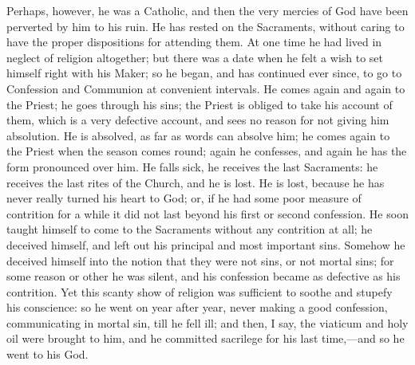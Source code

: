 Perhaps, however, he was a Catholic, and then the very mercies of
God have been perverted by him to his ruin. He has rested on the
Sacraments, without caring to have the proper dispositions for
attending them. At one time he had lived in neglect of religion
altogether; but there was a date when he felt a wish to set himself
right with his Maker; so he began, and has continued ever since, to go
to Confession and Communion at convenient intervals. He comes again
and again to the Priest; he goes through his sins; the Priest is
obliged to take his account of them, which is a very defective
account, and sees no reason for not giving him absolution. He is
absolved, as far as words can absolve him; he comes again to the
Priest when the season comes round; again he confesses, and again he
has the form pronounced over him. He falls sick, he receives the last
Sacraments: he receives the last rites of the Church, and he is lost.
He is lost, because he has never really turned his heart to God; or,
if he had some poor measure of contrition for a while it did not last
beyond his first or second confession. He soon taught himself to come
to the Sacraments without any contrition at all; he deceived himself,
and left out his principal and most important sins. Somehow he
deceived himself into the notion that they were not sins, or not
mortal sins; for some reason or other he was silent, and his
confession became as defective as his contrition. Yet this scanty show
of religion was sufficient to soothe and stupefy his conscience: so he
went on year after year, never making a good confession, communicating
in mortal sin, till he fell ill; and then, I say, the viaticum and
holy oil were brought to him, and he committed sacrilege for his last
time,—and so he went to his God.

